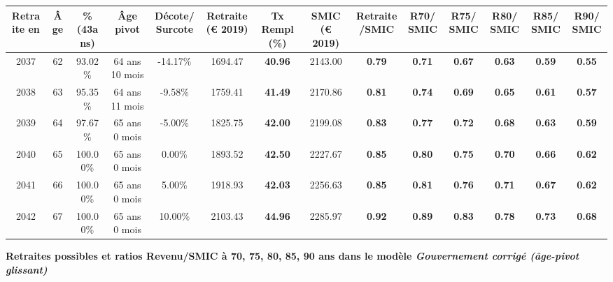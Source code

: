 \begin{adjustbox}{max width=\textwidth} 
\begin{tabular}[htb]{|c|c||c|c|c||c|c||c|c||c|c|c|c|c|} 
\hline 
 Retraite en &  Âge &  \%(43ans) &  Âge pivot &  Décote/Surcote &  Retraite (\euro{} 2019) &  Tx Rempl(\%) &  SMIC (\euro{} 2019) &  Retraite/SMIC &  R70/SMIC &  R75/SMIC &  R80/SMIC &  R85/SMIC &  R90/SMIC \\ 
\hline \hline 
 2037 &  62 &  93.02\% &  64 ans 10 mois &  -14.17\% &  1694.47 &  {\bf 40.96} &  2143.00 &  {\bf {\color{red} 0.79}} &  {\bf {\color{red} 0.71}} &  {\bf {\color{red} 0.67}} &  {\bf {\color{red} 0.63}} &  {\bf {\color{red} 0.59}} &  {\bf {\color{red} 0.55}} \\ 
\hline 
 2038 &  63 &  95.35\% &  64 ans 11 mois &  -9.58\% &  1759.41 &  {\bf 41.49} &  2170.86 &  {\bf {\color{red} 0.81}} &  {\bf {\color{red} 0.74}} &  {\bf {\color{red} 0.69}} &  {\bf {\color{red} 0.65}} &  {\bf {\color{red} 0.61}} &  {\bf {\color{red} 0.57}} \\ 
\hline 
 2039 &  64 &  97.67\% &  65 ans 0 mois &  -5.00\% &  1825.75 &  {\bf 42.00} &  2199.08 &  {\bf {\color{red} 0.83}} &  {\bf {\color{red} 0.77}} &  {\bf {\color{red} 0.72}} &  {\bf {\color{red} 0.68}} &  {\bf {\color{red} 0.63}} &  {\bf {\color{red} 0.59}} \\ 
\hline 
 2040 &  65 &  100.00\% &  65 ans 0 mois &  0.00\% &  1893.52 &  {\bf 42.50} &  2227.67 &  {\bf {\color{red} 0.85}} &  {\bf {\color{red} 0.80}} &  {\bf {\color{red} 0.75}} &  {\bf {\color{red} 0.70}} &  {\bf {\color{red} 0.66}} &  {\bf {\color{red} 0.62}} \\ 
\hline 
 2041 &  66 &  100.00\% &  65 ans 0 mois &  5.00\% &  1918.93 &  {\bf 42.03} &  2256.63 &  {\bf {\color{red} 0.85}} &  {\bf {\color{red} 0.81}} &  {\bf {\color{red} 0.76}} &  {\bf {\color{red} 0.71}} &  {\bf {\color{red} 0.67}} &  {\bf {\color{red} 0.62}} \\ 
\hline 
 2042 &  67 &  100.00\% &  65 ans 0 mois &  10.00\% &  2103.43 &  {\bf 44.96} &  2285.97 &  {\bf {\color{red} 0.92}} &  {\bf {\color{red} 0.89}} &  {\bf {\color{red} 0.83}} &  {\bf {\color{red} 0.78}} &  {\bf {\color{red} 0.73}} &  {\bf {\color{red} 0.68}} \\ 
\hline 
\hline 
\end{tabular} 
\end{adjustbox} 
 
 \vspace{0.1cm} 
{\bf \noindent Retraites possibles et ratios Revenu/SMIC à 70, 75, 80, 85, 90 ans dans le modèle \emph{Gouvernement corrigé (âge-pivot glissant)}}  
 
